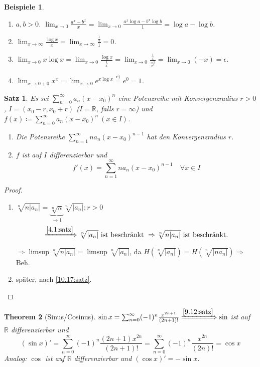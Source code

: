 \documentclass[12pt]{extreport} %
\newcommand{\R}{\mathbb{R}}
\theoremstyle{named}
\newtheorem{unnamedtheorem}{Theorem} \counterwithin{unnamedtheorem}{chapter}
\theoremstyle{dotless}
\newtheorem{satz}[unnamedtheorem]{Satz}
\newtheorem*{beispiele}{Beispiele}
\begin{document}
\begin{beispiele} ~\
	\begin{enumerate}
		\item $a, b > 0$. $\lim_{x \rightarrow 0} \frac{a^{x} - b^{x}}{x} = \lim_{x \rightarrow 0} \frac{a^{x} \log a - b^{x} \log b}{1} = \log a - \log b$.
		\item $\lim_{x \rightarrow \infty} \frac{\log x}{x} = \lim_{x \rightarrow \infty} \frac{\frac{1}{x}}{1} = 0$.
		\item $\lim_{x \rightarrow 0} x \log x = \lim_{x \rightarrow 0} \frac{\log x}{\frac{1}{x}} = \lim_{x \rightarrow 0} \frac{\frac{1}{x}}{\frac{-1}{x^{2}}} = \lim_{x \rightarrow 0} (-x) = \epsilon$.
		\item $\lim_{x \rightarrow 0 + 0} x^{x} = \lim_{x \rightarrow 0} e^{x \log x} \overset{c)}{=} e^{0} = 1$.
	\end{enumerate}
\end{beispiele}


\begin{satz} \label{9.12:satz}
	Es sei $\sum_{n=0}^{\infty} a_{n} (x - x_{0})^{n}$ eine Potenzreihe mit Konvergenzradius $r > 0$, $I = (x_{0}- r, x_{0} + r)$ ($I = \R$, falls $r = \infty$) und $f(x) \coloneqq \sum_{n = 0}^{\infty} a_{n} (x - x_{0})^{n} ~(x \in I)$.
	\begin{enumerate}
		\item Die Potenzreihe $\sum_{n=1}^{\infty} n a_{n} (x - x_{0})^{n-1}$ hat den Konvergenzradius $r$.
		\item $f$ ist auf $I$ differenzierbar und
			$$ f'(x) = \sum_{n=1}^{\infty} n a_{n} (x - x_{0})^{n-1} \quad \forall x \in I $$
	\end{enumerate}
\end{satz}

\begin{proof} ~\
	\begin{enumerate}
		\item $\sqrt[n]{n |a_{n}|} = \underbrace{\sqrt[n]{n}}_{\rightarrow 1} \sqrt[n]{|a_{n}|}; r > 0$ 
			$$ \xRightarrow[]{\ref{4.1:satz}} \sqrt[n]{|a_{n}|} \text{ ist beschränkt } \Rightarrow \sqrt[n]{n|a_{n}|} \text{ ist beschränkt.} $$
			$\Rightarrow \limsup \sqrt[n]{n|a_{n}|} = \limsup \sqrt[n]{|a_{n}|}$, da $H(\sqrt[n]{|a_{n}|}) = H(\sqrt[n]{|n a_{n}|}) \Rightarrow$ Beh.
		\item später, nach \ref{10.17:satz}.
	\end{enumerate}
\end{proof}

\begin{unnamedtheorem}[Sinus/Cosinus] \label{9.13:prop-SinusCosinus}
$\sin x =\sum_{n=0}^{\infty} (-1)^{n} \frac{x^{2n+1}}{(2n+1)!} \xRightarrow[]{\ref{9.12:satz}} \sin$ ist auf $\R$ differenzierbar und 
	$$ (\sin x)' = \sum_{n=0}^{\infty} (-1)^{n} \frac{(2n+1) x^{2n}}{(2n + 1)!} = \sum_{n=0}^{\infty} (-1)^{n} \frac{x^{2n}}{(2n)!} = \cos x $$
	Analog: $\cos$ ist auf $\R$ differenzierbar und $(\cos x)' = - \sin x$.
\end{unnamedtheorem}
	
\end{document}
